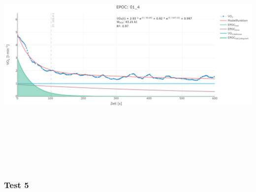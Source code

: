 \documentclass[
  letterpaper,
  DIV=11]{scrartcl}
\begin{document}
\includegraphics[width=11.45833in,height=4.6875in]{images/01_4.png}

\subsubsection{Test 5}
\end{document}
